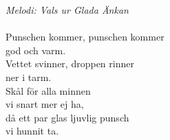 {\footnotesize\textit{Melodi: Vals ur Glada Änkan}}\\
\\
Punschen kommer, punschen kommer\\
god och varm.\\
Vettet svinner, droppen rinner\\
ner i tarm.\\
Skål för alla minnen\\
vi snart mer ej ha,\\
då ett par glas ljuvlig punsch\\
vi hunnit ta.
